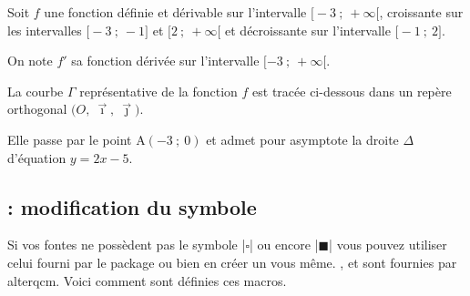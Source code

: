 \begin{tkzexample}
 \begin{minipage}[t][][b]{.45\linewidth}
  Soit $f$ une fonction définie et dérivable sur l'intervalle $\big[-3~;~+\infty\big[$,
   croissante sur les intervalles $\big[-3~;~-1\big]$ et $\big[2~;~+\infty\big[$
   et décroissante sur l'intervalle $\big[-1~;~2\big]$.
  
   On note $f'$ sa fonction dérivée sur l'intervalle $[-3~;~+\infty[$.
  
  La courbe $\Gamma$ représentative de la fonction $f$ est tracée ci-dessous
   dans un repère orthogonal $\big(O,~\vec{\imath},~\vec{\jmath}\big)$.
  
  Elle passe par le point A$(-3~;~0)$ et admet pour asymptote la droite
  $\Delta$ d'équation $y =  2x -5$.
 \end{minipage}
 \begin{minipage}[t][][b]{.45\linewidth}
 \null
{}
 \end{minipage}
 \begin{alterqcm}[VF,lq=125mm]
   \AQquestion{Pour tout $x \in ]-\infty~;~2],~f'(x) \geqslant 0$.}
 \end{alterqcm}
\end{tkzexample}

\subsection{ : modification du symbole } 

 Si vos fontes ne possèdent pas le symbole |$\square$| ou encore |$\blacksquare$| vous pouvez utiliser celui fourni par le package ou bien en créer un vous même. ,  et  sont fournies par alterqcm.
 Voici comment sont définies ces macros.
 
